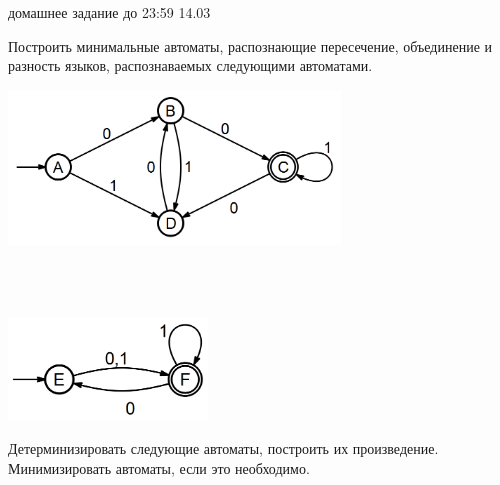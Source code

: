 \documentclass[12pt]{article}
\begin{document}

{\Large домашнее задание до 23:59 14.03}
\bigskip

\enumerate
{
  \item
  { Построить минимальные автоматы, распознающие пересечение, объединение и разность языков, распознаваемых следующими автоматами.
  

          \includegraphics[width=250pt]{2_0.png}

~\\~

          \includegraphics[width=150pt]{2_1.png} 

  }
    
  \item Детерминизировать следующие автоматы, построить их произведение. Минимизировать автоматы, если это необходимо. 
  
}

\end{document}
